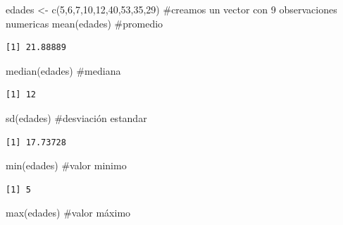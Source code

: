 \documentclass[
  letterpaper,
  DIV=11,
  numbers=noendperiod]{scrreprt}
\newenvironment{Shaded}{\begin{snugshade}}{\end{snugshade}}
\newcommand{\CommentTok}[1]{\textcolor[rgb]{0.37,0.37,0.37}{#1}}
\newcommand{\DecValTok}[1]{\textcolor[rgb]{0.68,0.00,0.00}{#1}}
\newcommand{\FunctionTok}[1]{\textcolor[rgb]{0.28,0.35,0.67}{#1}}
\newcommand{\NormalTok}[1]{\textcolor[rgb]{0.00,0.23,0.31}{#1}}
\newcommand{\OtherTok}[1]{\textcolor[rgb]{0.00,0.23,0.31}{#1}}
\begin{document}
\begin{Shaded}
\begin{Highlighting}[]
\NormalTok{edades }\OtherTok{\textless{}{-}} \FunctionTok{c}\NormalTok{(}\DecValTok{5}\NormalTok{,}\DecValTok{6}\NormalTok{,}\DecValTok{7}\NormalTok{,}\DecValTok{10}\NormalTok{,}\DecValTok{12}\NormalTok{,}\DecValTok{40}\NormalTok{,}\DecValTok{53}\NormalTok{,}\DecValTok{35}\NormalTok{,}\DecValTok{29}\NormalTok{) }\CommentTok{\#creamos un vector con 9 observaciones numericas }
\FunctionTok{mean}\NormalTok{(edades)   }\CommentTok{\#promedio }
\end{Highlighting}
\end{Shaded}

\begin{verbatim}
[1] 21.88889
\end{verbatim}

\begin{Shaded}
\begin{Highlighting}[]
\FunctionTok{median}\NormalTok{(edades) }\CommentTok{\#mediana }
\end{Highlighting}
\end{Shaded}

\begin{verbatim}
[1] 12
\end{verbatim}

\begin{Shaded}
\begin{Highlighting}[]
\FunctionTok{sd}\NormalTok{(edades)     }\CommentTok{\#desviación estandar }
\end{Highlighting}
\end{Shaded}

\begin{verbatim}
[1] 17.73728
\end{verbatim}

\begin{Shaded}
\begin{Highlighting}[]
\FunctionTok{min}\NormalTok{(edades)    }\CommentTok{\#valor minimo }
\end{Highlighting}
\end{Shaded}

\begin{verbatim}
[1] 5
\end{verbatim}

\begin{Shaded}
\begin{Highlighting}[]
\FunctionTok{max}\NormalTok{(edades)    }\CommentTok{\#valor máximo  }
\end{Highlighting}
\end{Shaded}
\end{document}
